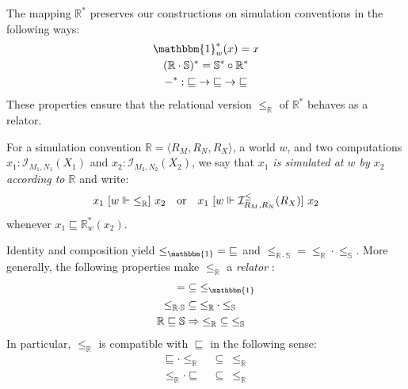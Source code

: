 The mapping $\mathbb{R}^*$ preserves our constructions
on simulation conventions in the following ways:
\begin{gather*}
\mathbbm{1}^*_w(x) = x \\
(\mathbb{R} \cdot \mathbb{S})^* = \mathbb{S}^* \circ \mathbb{R}^* \\
-^* : {\sqsubseteq} \rightarrow {\sqsubseteq} \rightarrow {\sqsubseteq}
\end{gather*}
These properties ensure that
the relational version $\le_\mathbb{R}$ of $\mathbb{R}^*$
behaves as a relator.

\begin{definition}
For a simulation convention $\mathbb{R} = \langle R_M, R_N, R_X \rangle$,
a world $w$,
and two computations
$x_1 : \mathcal{I}_{M_1, N_1}(X_1)$ and
$x_2 : \mathcal{I}_{M_2, N_2}(X_2)$,
we say that
\emph{$x_1$ is simulated at $w$ by $x_2$ according to $\mathbb{R}$}
and write:
\[
    x_1 \ [{w \Vdash {\le}_\mathbb{R}}]\  x_2
    \quad \mbox{or} \quad
    x_1 \ [{w \Vdash \mathcal{I}^\le_{R_M,R_N}(R_X)}]\  x_2
\]
whenever $x_1 \sqsubseteq \mathbb{R}^*_w(x_2)$.
\end{definition}

Identity and composition yield
${\le}_\mathbbm{1} = {\sqsubseteq}$ and
${\le}_{\mathbb{R} \cdot \mathbb{S}} =
 {\le}_\mathbb{R} \cdot {\le}_\mathbb{S}$.
More generally,
the following properties make
$\le_\mathbb{R}$ a \emph{relator} \cite{something}:
\begin{align*}
  {=} &\subseteq {\le}_\mathbbm{1} \\
  {\le}_{\mathbb{R} \cdot \mathbb{S}} &\subseteq
    {\le}_\mathbb{R} \cdot {\le}_\mathbb{S} \\
  \mathbb{R} \sqsubseteq \mathbb{S} &\Rightarrow
    {\le}_\mathbb{R} \subseteq {\le}_\mathbb{S}
\end{align*}
In particular, $\le_\mathbb{R}$ is compatible with $\sqsubseteq$
in the following sense:
\begin{align*}
    {\sqsubseteq} \cdot {\le}_\mathbb{R} &\:\subseteq\: {\le}_\mathbb{R} \\
    {\le}_\mathbb{R} \cdot {\sqsubseteq} &\:\subseteq\: {\le}_\mathbb{R}
\end{align*}

